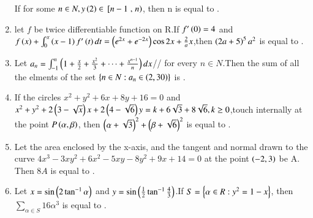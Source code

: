 \documentclass[journal,12pt,onecolumn,article]{IEEEtran}
\theoremstyle{remark}
\begin{document}
\begin{enumerate}
If for some $n \in N, y\left(2\right) \in {}\left[n-1\right.,\left.n\right)$, then n is equal to .
\item let $f$ be twice differentiable function on R.If $f'\left(0\right) = 4$ and ${f\left(x\right)+ \int_{0}^{x} \left(x-1\right)f'\left(t\right)dt =  \left(e^{2x} + e^{-2x}\right)\cos{2x} + \frac{2}{a} x}$,then $\left(2a+5\right)^5a^2$ is equal to .
\item Let $a_n=\int_{-1}^{n}\left(1+\frac{x}{2}+\frac{x^2}{3}+\dots+\frac{x^{n-1}}{n}\right)dx$//
for every $n \in N$.Then the sum of all the elments of the set $\left\{n \in N: a_n \in \left(2,30\right)\right\}$ is .
\item If the circles $x^2+y^2+6x+8y+16=0$ and ${x^2+y^2+2\left(3-\sqrt{x}\right)x+2\left(4-\sqrt{6}\right)y = k+6\sqrt{3} +8\sqrt{6},k\ge 0}$,touch internally at the point 
$P\left(\alpha,\beta\right)$, then $\left(\alpha+\sqrt{3}\right)^2+\left(\beta+\sqrt{6}\right)^2$ is equal to .
\item Let the area enclosed by the x-axis, and the tangent and normal drawn to the curve $4x^3-3xy^2+6x^2-5xy-8y^2+9x+14 = 0$ at the point $\left(-2,3\right)$ be A. Then $8A$ is equal to .
\item Let $x=\sin\left(2\tan^{-1}\alpha\right)$ and $y=\sin\left(\frac{1}{2}\tan^{-1}\frac{4}{3}\right)$.If ${S=\left\{\alpha \in R : y^2=1-x\right\}}$, then ${\sum_{\alpha \in S} 16\alpha^3}$ is equal to .
\end{enumerate}
\end{document}
